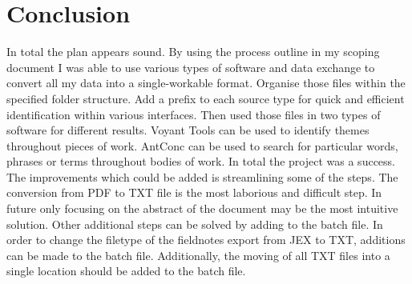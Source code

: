 \documentclass{article}
\begin{document}
\section*{Conclusion}
In total the plan appears sound. By using the process outline in my scoping document I was able to use various types of software and data exchange to convert all my data into a single-workable format. Organise those files within the specified folder structure. Add a prefix to each source type for quick and efficient identification within various interfaces. Then used those files in two types of software for different results. Voyant Tools can be used to identify themes throughout pieces of work. AntConc can be used to search for particular words, phrases or terms throughout bodies of work. In total the project was a success.\\
\newline
The improvements which could be added is streamlining some of the steps. The conversion from PDF to TXT file is the most laborious and difficult step. In future only focusing on the abstract of the document may be the most intuitive solution. Other additional steps can be solved by adding to the batch file. In order to change the filetype of the fieldnotes export from JEX to TXT, additions can be made to the batch file. Additionally, the moving of all TXT files into a single location should be added to the batch file.  
\end{document}
